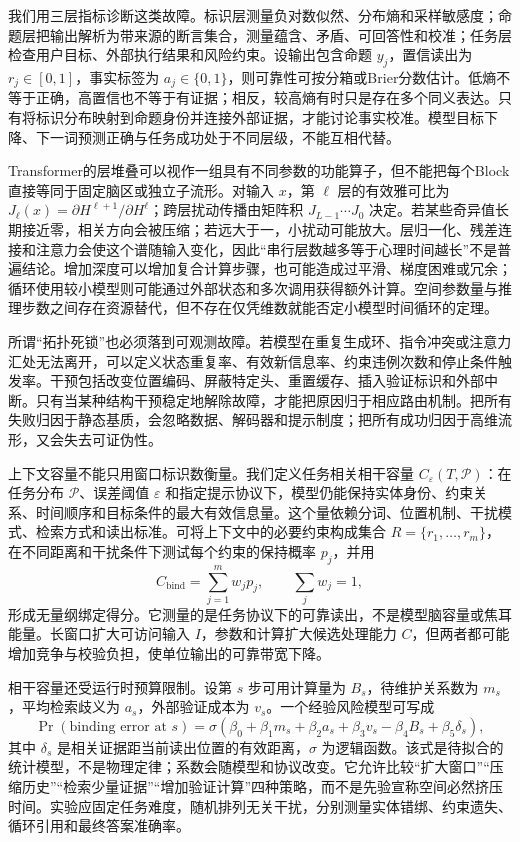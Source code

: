 我们用三层指标诊断这类故障。标识层测量负对数似然、分布熵和采样敏感度；命题层把输出解析为带来源的断言集合，测量蕴含、矛盾、可回答性和校准；任务层检查用户目标、外部执行结果和风险约束。设输出包含命题 $y_j$，置信读出为 $r_j\in[0,1]$，事实标签为 $a_j\in\{0,1\}$，则可靠性可按分箱或Brier分数估计。低熵不等于正确，高置信也不等于有证据；相反，较高熵有时只是存在多个同义表达。只有将标识分布映射到命题身份并连接外部证据，才能讨论事实校准。模型目标下降、下一词预测正确与任务成功处于不同层级，不能互相代替。

\label{subsec:llm_spatial_topology_pathology}
Transformer的层堆叠可以视作一组具有不同参数的功能算子，但不能把每个Block直接等同于固定脑区或独立子流形。对输入 $x$，第 $\ell$ 层的有效雅可比为 $J_\ell(x)=\partial H^{\ell+1}/\partial H^\ell$；跨层扰动传播由矩阵积 $J_{L-1}\cdots J_0$ 决定。若某些奇异值长期接近零，相关方向会被压缩；若远大于一，小扰动可能放大。层归一化、残差连接和注意力会使这个谱随输入变化，因此“串行层数越多等于心理时间越长”不是普遍结论。增加深度可以增加复合计算步骤，也可能造成过平滑、梯度困难或冗余；循环使用较小模型则可能通过外部状态和多次调用获得额外计算。空间参数量与推理步数之间存在资源替代，但不存在仅凭维数就能否定小模型时间循环的定理。

所谓“拓扑死锁”也必须落到可观测故障。若模型在重复生成环、指令冲突或注意力汇处无法离开，可以定义状态重复率、有效新信息率、约束违例次数和停止条件触发率。干预包括改变位置编码、屏蔽特定头、重置缓存、插入验证标识和外部中断。只有当某种结构干预稳定地解除故障，才能把原因归于相应路由机制。把所有失败归因于静态基质，会忽略数据、解码器和提示制度；把所有成功归因于高维流形，又会失去可证伪性。

\label{subsec:llm_wm_coherence_capacity}
上下文容量不能只用窗口标识数衡量。我们定义任务相关相干容量 $C_{\varepsilon}(T,\mathcal P)$：在任务分布 $\mathcal P$、误差阈值 $\varepsilon$ 和指定提示协议下，模型仍能保持实体身份、约束关系、时间顺序和目标条件的最大有效信息量。这个量依赖分词、位置机制、干扰模式、检索方式和读出标准。可将上下文中的必要约束构成集合 $R=\{r_1,\ldots,r_m\}$，在不同距离和干扰条件下测试每个约束的保持概率 $p_j$，并用
\[
C_{\mathrm{bind}}=\sum_{j=1}^{m}w_jp_j,
\qquad \sum_jw_j=1,
\]
形成无量纲绑定得分。它测量的是任务协议下的可靠读出，不是模型脑容量或焦耳能量。长窗口扩大可访问输入 $I$，参数和计算扩大候选处理能力 $C$，但两者都可能增加竞争与校验负担，使单位输出的可靠带宽下降。

\label{subsec:llm_wm_coherence_capacity_extended}
相干容量还受运行时预算限制。设第 $s$ 步可用计算量为 $B_s$，待维护关系数为 $m_s$，平均检索歧义为 $a_s$，外部验证成本为 $v_s$。一个经验风险模型可写成
\[
\Pr(\text{binding error at }s)
=\sigma(\beta_0+\beta_1m_s+\beta_2a_s+\beta_3v_s
-\beta_4B_s+\beta_5\delta_s),
\]
其中 $\delta_s$ 是相关证据距当前读出位置的有效距离，$\sigma$ 为逻辑函数。该式是待拟合的统计模型，不是物理定律；系数会随模型和协议改变。它允许比较“扩大窗口”“压缩历史”“检索少量证据”“增加验证计算”四种策略，而不是先验宣称空间必然挤压时间。实验应固定任务难度，随机排列无关干扰，分别测量实体错绑、约束遗失、循环引用和最终答案准确率。

